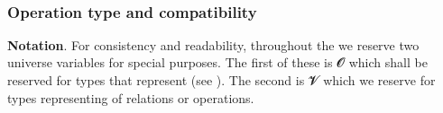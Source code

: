 \ccpad
\begin{code}%
\>[1]\AgdaSpace{}%
\AgdaSymbol{:}\AgdaSpace{}%
\AgdaSpace{}%
\AgdaSpace{}%
\AgdaSpace{}%
\AgdaSpace{}%
\AgdaSymbol{(}\AgdaSpace{}%
\AgdaSpace{}%
\AgdaSymbol{)}\AgdaSpace{}%
\AgdaSpace{}%
\AgdaSpace{}%
\AgdaSpace{}%
\AgdaSpace{}%
\AgdaSpace{}%
\AgdaSpace{}%
\AgdaSpace{}%
\AgdaSpace{}%
\AgdaSpace{}%
\AgdaSpace{}%
\<%
\\
%
\>[1]\AgdaSpace{}%
\AgdaOperator{\AgdaFunction{=[}}\AgdaSpace{}%
\AgdaSpace{}%
\AgdaOperator{\AgdaFunction{]⇒}}\AgdaSpace{}%
\AgdaSpace{}%
\AgdaSymbol{=}\AgdaSpace{}%
\AgdaSpace{}%
\AgdaSpace{}%
\AgdaSymbol{(}\AgdaSpace{}%
\AgdaSpace{}%
\AgdaSymbol{)}\<%
\end{code}

\subsubsection*{Operation type and compatibility}%

\textbf{Notation}. For consistency and readability, throughout the \ualib we reserve two universe variables for special purposes.  The first of these is \ab 𝓞 which shall be reserved for types that represent  (see ). The second is \ab 𝓥 which we reserve for types representing  of relations or operations.

